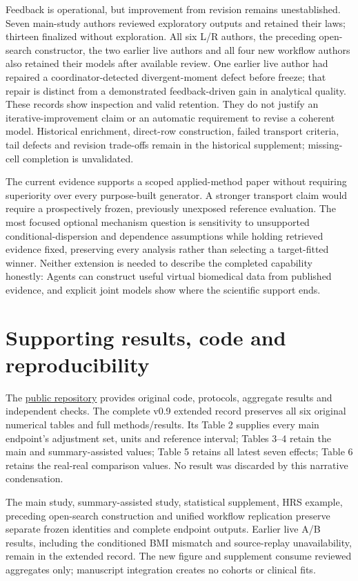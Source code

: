 \documentclass[10pt,twocolumn]{article}
\begin{document}
Feedback is operational, but improvement from revision remains unestablished. Seven main-study authors reviewed exploratory outputs and retained their laws; thirteen finalized without exploration. All six L/R authors, the preceding open-search constructor, the two earlier live authors and all four new workflow authors also retained their models after available review. One earlier live author had repaired a coordinator-detected divergent-moment defect before freeze; that repair is distinct from a demonstrated feedback-driven gain in analytical quality. These records show inspection and valid retention. They do not justify an iterative-improvement claim or an automatic requirement to revise a coherent model. Historical enrichment, direct-row construction, failed transport criteria, tail defects and revision trade-offs remain in the historical supplement; missing-cell completion is unvalidated.


The current evidence supports a scoped applied-method paper without requiring superiority over every purpose-built generator. A stronger transport claim would require a prospectively frozen, previously unexposed reference evaluation. The most focused optional mechanism question is sensitivity to unsupported conditional-dispersion and dependence assumptions while holding retrieved evidence fixed, preserving every analysis rather than selecting a target-fitted winner. Neither extension is needed to describe the completed capability honestly: Agents can construct useful virtual biomedical data from published evidence, and explicit joint models show where the scientific support ends.


\section{Supporting results, code and reproducibility}

The \href{https://github.com/ziwang11112/evidence-guided-virtual-cohorts-2026}{public repository} provides original code, protocols, aggregate results and independent checks. The complete v0.9 extended record preserves all six original numerical tables and full methods/results. Its Table 2 supplies every main endpoint's adjustment set, units and reference interval; Tables 3–4 retain the main and summary-assisted values; Table 5 retains all latest seven effects; Table 6 retains the real-real comparison values. No result was discarded by this narrative condensation.


The main study, summary-assisted study, statistical supplement, HRS example, preceding open-search construction and unified workflow replication preserve separate frozen identities and complete endpoint outputs. Earlier live A/B results, including the conditioned BMI mismatch and source-replay unavailability, remain in the extended record. The new figure and supplement consume reviewed aggregates only; manuscript integration creates no cohorts or clinical fits.
\end{document}
